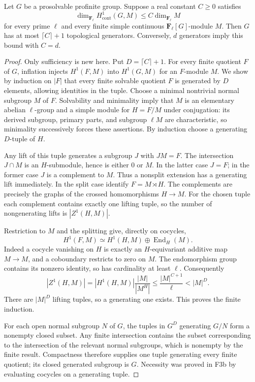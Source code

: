 \begin{proposition}
Let $G$ be a prosolvable profinite group. Suppose a real constant $C\geq0$
satisfies
\[
 \dim_{\mathbf F_\ell}H^1_{\mathrm{cont}}(G,M)
 \leq C\dim_{\mathbf F_\ell}M
\]
for every prime $\ell$ and every finite simple continuous
$\mathbf F_\ell[G]$-module $M$. Then $G$ has at most
$\lceil C\rceil+1$ topological generators. Conversely, $d$ generators
imply this bound with $C=d$.
\end{proposition}
\begin{proof}
Only sufficiency is new here. Put $D=\lceil C\rceil+1$.
For every finite quotient $F$ of $G$, inflation injects
$H^1(F,M)$ into $H^1(G,M)$ for an $F$-module $M$.
We show by induction on $|F|$ that every finite solvable quotient
$F$ is generated by $D$ elements, allowing identities in the tuple.
Choose a minimal nontrivial normal subgroup $M$ of $F$.
Solvability and minimality imply that $M$ is an elementary abelian
$\ell$-group and a simple module for $H=F/M$ under conjugation:
its derived subgroup, primary parts, and subgroup $\ell M$ are
characteristic, so minimality successively forces these assertions.
By induction choose a generating $D$-tuple of $H$.

Any lift of this tuple generates a subgroup $J$ with $JM=F$.
The intersection $J\cap M$ is an $H$-submodule, hence is either
$0$ or $M$. In the latter case $J=F$; in the former case $J$ is
a complement to $M$. Thus a nonsplit extension has a generating
lift immediately. In the split case identify $F=M\rtimes H$.
The complements are precisely the graphs of the crossed
homomorphisms $H\to M$. For the chosen tuple each complement
contains exactly one lifting tuple, so the number of nongenerating
lifts is $|Z^1(H,M)|$.

Restriction to $M$ and the splitting give, directly on cocycles,
\[
 H^1(F,M)\simeq H^1(H,M)\oplus\operatorname{End}_H(M).
\]
Indeed a cocycle vanishing on $H$ is exactly an $H$-equivariant
additive map $M\to M$, and a coboundary restricts to zero on $M$.
The endomorphism group contains its nonzero identity, so has
cardinality at least $\ell$. Consequently
\[
 |Z^1(H,M)|
 =|H^1(H,M)|\frac{|M|}{|M^H|}
 \leq \frac{|M|^{C+1}}{\ell}
 <|M|^D.
\]
There are $|M|^D$ lifting tuples, so a generating one exists.
This proves the finite induction.

For each open normal subgroup $N$ of $G$, the tuples in $G^D$
generating $G/N$ form a nonempty closed subset. Any finite
intersection contains the subset corresponding to the
intersection of the relevant normal subgroups, which is nonempty
by the finite result. Compactness therefore supplies one tuple
generating every finite quotient; its closed generated subgroup
is $G$. Necessity was proved in F3b by evaluating cocycles on a
generating tuple.
\end{proof}

